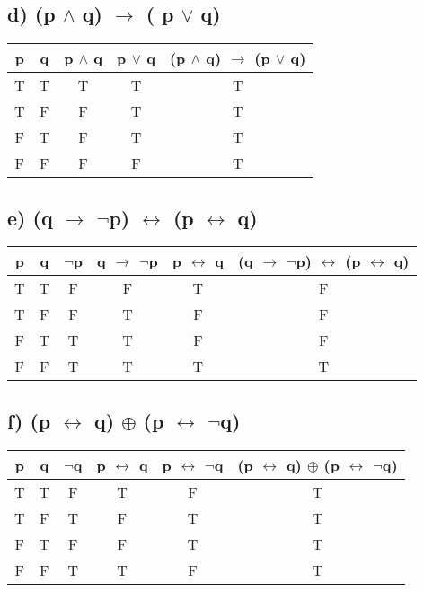 \documentclass[11pt, oneside]{article} %
\numberwithin{equation}{section} %
\numberwithin{figure}{section} %
\begin{document}
\begin{table}[!htp]
\subsection{d) (p  $\wedge$ q) $\rightarrow$ ( p $\vee$ q)}
\begin{tabular}{c c c c c}
\hline\hline
p & q & p  $\wedge$ q & p $\vee$ q & (p  $\wedge$ q) $\rightarrow$ (p $\vee$ q) \\ [0.5ex] %
\hline
T & T & T & T & T\\
T & F & F & T & T\\
F & T & F  & T & T\\
F & F & F & F & T\\ [1ex]
\hline
\end{tabular}
\label{table:nonlin}
\end{table}

\begin{table}[!htp]
\subsection{e) (q $\rightarrow$ $\neg$p) $\leftrightarrow$ (p $\leftrightarrow$ q)}
\begin{tabular}{c c c c c c}
\hline\hline
p & q & $\neg$p & q $\rightarrow$ $\neg$p & p $\leftrightarrow$ q & (q $\rightarrow$ $\neg$p) $\leftrightarrow$ (p $\leftrightarrow$ q) \\ [0.5ex] %
\hline
T & T & F & F & T & F\\
T & F & F & T & F & F\\
F & T & T & T & F & F\\
F & F & T & T & T & T \\ [1ex]
\hline
\end{tabular}
\label{table:nonlin}
\end{table}

\begin{table}[!htp]
\subsection{f) (p $\leftrightarrow$ q) $\oplus$ (p $\leftrightarrow$ $\neg$q)}
\begin{tabular}{c c c c c c}
\hline\hline
p & q & $\neg$q & p $\leftrightarrow$ q & p $\leftrightarrow$ $\neg$q & (p $\leftrightarrow$ q) $\oplus$ (p $\leftrightarrow$ $\neg$q) \\ [0.5ex] %
\hline
T & T & F & T & F & T\\
T & F & T & F & T & T\\
F & T & F  & F & T & T\\
F & F & T & T & F & T\\ [1ex]
\hline
\end{tabular}
\label{table:nonlin}
\end{table}
\end{document}
